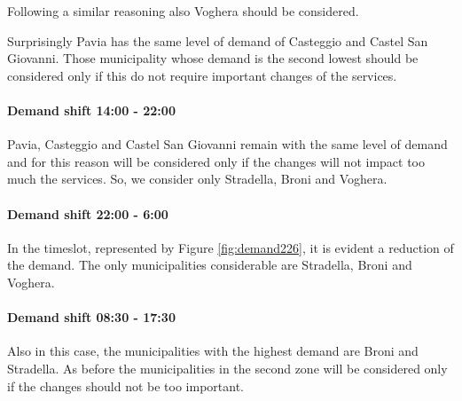 Following a similar reasoning also Voghera should be considered.

Surprisingly Pavia has the same level of demand of Casteggio and Castel San Giovanni. Those municipality whose demand is the second lowest should be considered only if this do not require important changes of the services.

\paragraph{Demand shift 14:00 - 22:00}
Pavia, Casteggio and Castel San Giovanni remain with the same level of demand and for this reason will be considered only if the changes will not impact too much the services.
So, we consider only Stradella, Broni and Voghera. 

\paragraph{Demand shift  22:00 - 6:00}
In the timeslot, represented by Figure \ref{fig:demand226}, it is evident a reduction of the demand. The only municipalities considerable are Stradella, Broni and Voghera.


\paragraph{Demand shift 08:30 - 17:30}
Also in this case, the municipalities with the highest demand are Broni and Stradella. As before the municipalities in the second zone will be considered only if the changes should not be too important.

\begin{figure}
\centering
{}\hfill
{}
\end{figure}

\begin{figure}
    \centering
{}\hfill
{}
\end{figure}

